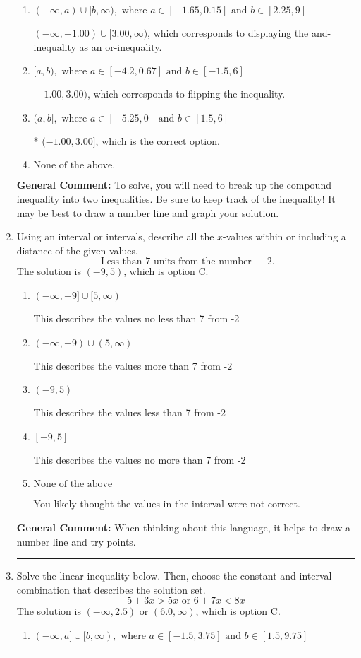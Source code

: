 \documentclass{extbook}[14pt]
\newcommand{\litem}[1]{\item #1

\rule{\textwidth}{0.4pt}}
\begin{document}
\begin{enumerate}
{\begin{enumerate}[label=\Alph*.]
$(-\infty, -1.00] \cup (3.00, \infty)$, which corresponds to displaying the and-inequality as an or-inequality AND flipping the inequality.
\item \( (-\infty, a) \cup [b, \infty), \text{ where } a \in [-1.65, 0.15] \text{ and } b \in [2.25, 9] \)

$(-\infty, -1.00) \cup [3.00, \infty)$, which corresponds to displaying the and-inequality as an or-inequality.
\item \( [a, b), \text{ where } a \in [-4.2, 0.67] \text{ and } b \in [-1.5, 6] \)

$[-1.00, 3.00)$, which corresponds to flipping the inequality.
\item \( (a, b], \text{ where } a \in [-5.25, 0] \text{ and } b \in [1.5, 6] \)

* $(-1.00, 3.00]$, which is the correct option.
\item \( \text{None of the above.} \)


\end{enumerate}

\textbf{General Comment:} To solve, you will need to break up the compound inequality into two inequalities. Be sure to keep track of the inequality! It may be best to draw a number line and graph your solution.
}
\litem{
Using an interval or intervals, describe all the $x$-values within or including a distance of the given values.
\[ \text{ Less than } 7 \text{ units from the number } -2. \]The solution is \( (-9, 5) \), which is option C.\begin{enumerate}[label=\Alph*.]
\item \( (-\infty, -9] \cup [5, \infty) \)

This describes the values no less than 7 from -2
\item \( (-\infty, -9) \cup (5, \infty) \)

This describes the values more than 7 from -2
\item \( (-9, 5) \)

This describes the values less than 7 from -2
\item \( [-9, 5] \)

This describes the values no more than 7 from -2
\item \( \text{None of the above} \)

You likely thought the values in the interval were not correct.
\end{enumerate}

\textbf{General Comment:} When thinking about this language, it helps to draw a number line and try points.
}
\litem{
Solve the linear inequality below. Then, choose the constant and interval combination that describes the solution set.
\[ 5 + 3 x > 5 x \text{ or } 6 + 7 x < 8 x \]The solution is \( (-\infty, 2.5) \text{ or } (6.0, \infty) \), which is option C.\begin{enumerate}[label=\Alph*.]
\item \( (-\infty, a] \cup [b, \infty), \text{ where } a \in [-1.5, 3.75] \text{ and } b \in [1.5, 9.75] \)


\end{enumerate}}
\end{enumerate}
\end{document}
